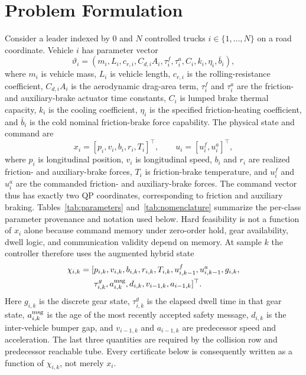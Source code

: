 \section{Problem Formulation}
Consider a leader indexed by $0$ and $N$ controlled trucks $i\in\{1,\ldots,N\}$ on a road coordinate. Vehicle $i$ has parameter vector
\begin{equation}
\vartheta_i=(m_i,L_i,c_{r,i},C_{d,i}A_i,\tau_i^f,\tau_i^a,C_i,k_i,\eta_i,\bar b_i),
\end{equation}
where $m_i$ is vehicle mass, $L_i$ is vehicle length, $c_{r,i}$ is the rolling-resistance coefficient, $C_{d,i}A_i$ is the aerodynamic drag-area term, $\tau_i^f$ and $\tau_i^a$ are the friction- and auxiliary-brake actuator time constants, $C_i$ is lumped brake thermal capacity, $k_i$ is the cooling coefficient, $\eta_i$ is the specified friction-heating coefficient, and $\bar b_i$ is the cold nominal friction-brake force capability. The physical state and command are
\begin{equation}
x_i=[p_i,v_i,b_i,r_i,T_i]^\top,\qquad
u_i=[u_i^f,u_i^a]^\top,
\end{equation}
where $p_i$ is longitudinal position, $v_i$ is longitudinal speed, $b_i$ and $r_i$ are realized friction- and auxiliary-brake forces, $T_i$ is friction-brake temperature, and $u_i^f$ and $u_i^a$ are the commanded friction- and auxiliary-brake forces. The command vector thus has exactly two QP coordinates, corresponding to friction and auxiliary braking. Tables~\ref{tab:parameters} and~\ref{tab:nomenclature} summarize the per-class parameter provenance and notation used below.
Hard feasibility is not a function of $x_i$ alone because command memory under zero-order hold, gear availability, dwell logic, and communication validity depend on memory. At sample $k$ the controller therefore uses the augmented hybrid state
\begin{equation}\label{eq:chi}
\begin{aligned}
\chi_{i,k}=[&p_{i,k},v_{i,k},b_{i,k},r_{i,k},T_{i,k},
u^f_{i,k-1},u^a_{i,k-1},g_{i,k},\\
&\tau^g_{i,k},a^{\rm msg}_{i,k},d_{i,k},
v_{i-1,k},a_{i-1,k}]^\top .
\end{aligned}
\end{equation}
Here $g_{i,k}$ is the discrete gear state, $\tau^g_{i,k}$ is the elapsed dwell time in that gear state, $a^{\rm msg}_{i,k}$ is the age of the most recently accepted safety message, $d_{i,k}$ is the inter-vehicle bumper gap, and $v_{i-1,k}$ and $a_{i-1,k}$ are predecessor speed and acceleration. The last three quantities are required by the collision row and predecessor reachable tube. Every certificate below is consequently written as a function of $\chi_{i,k}$, not merely $x_i$.

